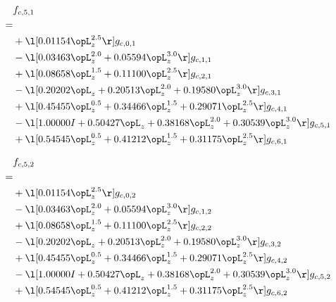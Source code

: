 \begin{alignat}{2} 
\label{eq:f_51_0} 
& f_{c,5,1} \nonumber \\ 
 = \\ 
& + \l[  0.01154 \opL_z^{2.5}  \r] g_{c,0,1} \nonumber \\ 
& - \l[  0.03463 \opL_z^{2.0} +  0.05594 \opL_z^{3.0}  \r] g_{c,1,1} \nonumber \\ 
& + \l[  0.08658 \opL_z^{1.5} +  0.11100 \opL_z^{2.5}  \r] g_{c,2,1} \nonumber \\ 
& - \l[  0.20202 \opL_z +  0.20513 \opL_z^{2.0} +  0.19580 \opL_z^{3.0}  \r] g_{c,3,1} \nonumber \\ 
& + \l[  0.45455 \opL_z^{0.5} +  0.34466 \opL_z^{1.5} +  0.29071 \opL_z^{2.5}  \r] g_{c,4,1} \nonumber \\ 
& - \l[  1.00000 I +  0.50427 \opL_z +  0.38168 \opL_z^{2.0} +  0.30539 \opL_z^{3.0}  \r] g_{c,5,1} \nonumber \\ 
& + \l[  0.54545 \opL_z^{0.5} +  0.41212 \opL_z^{1.5} +  0.31175 \opL_z^{2.5}  \r] g_{c,6,1} \nonumber \\ 
\end{alignat} 


\begin{alignat}{2} 
\label{eq:f_52_0} 
& f_{c,5,2} \nonumber \\ 
 = \\ 
& + \l[  0.01154 \opL_z^{2.5}  \r] g_{c,0,2} \nonumber \\ 
& - \l[  0.03463 \opL_z^{2.0} +  0.05594 \opL_z^{3.0}  \r] g_{c,1,2} \nonumber \\ 
& + \l[  0.08658 \opL_z^{1.5} +  0.11100 \opL_z^{2.5}  \r] g_{c,2,2} \nonumber \\ 
& - \l[  0.20202 \opL_z +  0.20513 \opL_z^{2.0} +  0.19580 \opL_z^{3.0}  \r] g_{c,3,2} \nonumber \\ 
& + \l[  0.45455 \opL_z^{0.5} +  0.34466 \opL_z^{1.5} +  0.29071 \opL_z^{2.5}  \r] g_{c,4,2} \nonumber \\ 
& - \l[  1.00000 I +  0.50427 \opL_z +  0.38168 \opL_z^{2.0} +  0.30539 \opL_z^{3.0}  \r] g_{c,5,2} \nonumber \\ 
& + \l[  0.54545 \opL_z^{0.5} +  0.41212 \opL_z^{1.5} +  0.31175 \opL_z^{2.5}  \r] g_{c,6,2} \nonumber \\ 
\end{alignat} 



